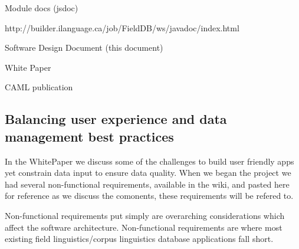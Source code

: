 \documentclass[12pt]{article}
\begin{document}
Module docs (jsdoc)

http://builder.ilanguage.ca/job/FieldDB/ws/javadoc/index.html

Software Design Document (this document)

White Paper

CAML publication

\subsection{Balancing user experience and data management best practices}

In the WhitePaper we discuss some of the challenges to build user friendly apps yet constrain data input to ensure data quality. When we began the project we had several non-functional requirements, available in the wiki, and pasted here for reference as we discuss the comonents, these requirements will be refered to.


Non-functional requirements put simply are overarching considerations which affect the software architecture. Non-functional requirements are where most existing field linguistics/corpus linguistics database applications fall short.
\end{document}
